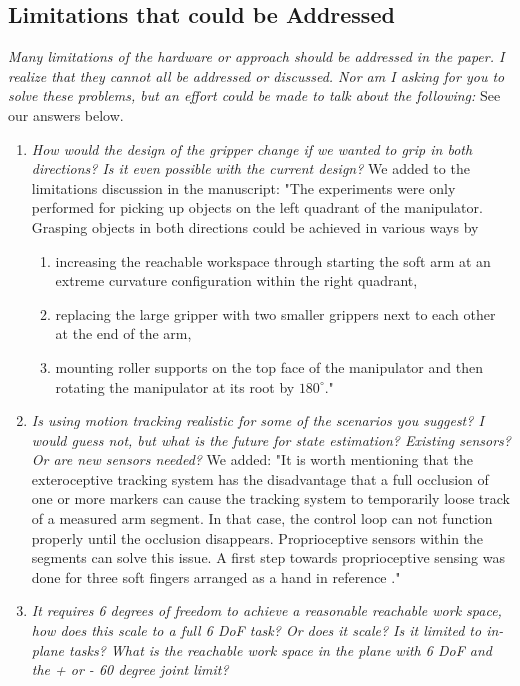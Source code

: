 \documentclass[letterpaper, 10 pt, twocolumn, conference]{article}
\begin{document}
\subsection{Limitations that could be Addressed}
\textit{Many limitations of the hardware or approach should be addressed in the paper. I realize that they cannot all be addressed or discussed. Nor am I asking for you to solve these problems, but an effort could be made to talk about the following:}
See our answers below.
%
\begin{enumerate}
\item \textit{How would the design of the gripper change if we wanted to grip in both directions? Is it even possible with the current design?}
%
We added to the limitations discussion in the manuscript:
"The experiments were only performed for picking up objects on the left quadrant of the manipulator. Grasping objects in both directions could be achieved in various ways by 
\begin{enumerate}
\item increasing the reachable workspace through starting the soft arm at an extreme curvature configuration within the right quadrant,
\item replacing the large gripper with two smaller grippers next to each other at the end of the arm, 
\item mounting roller supports on the top face of the manipulator and then rotating the manipulator at its root by $180^{\circ}$."  
\end{enumerate}
%
\item \textit{Is using motion tracking realistic for some of the scenarios you suggest? I would guess not, but what is the future for state estimation? Existing sensors? Or are new sensors needed?}
%
We added:
"It is worth mentioning that the exteroceptive tracking system has the disadvantage that a full occlusion of one or more markers can cause the tracking system to temporarily loose track of a measured arm segment. In that case, the control loop can not function properly until the occlusion disappears. Proprioceptive sensors within the segments can solve this issue. A first step towards proprioceptive sensing was done for three soft fingers arranged as a hand in reference \cite{homberg2015haptic}."
%
\item \textit{It requires 6 degrees of freedom to achieve a reasonable reachable work space, how does this scale to a full 6 DoF task? Or does it scale? Is it limited to in-plane tasks? What is the reachable work space in the plane with 6 DoF and the + or - 60 degree joint limit?}

\end{enumerate}
\end{document}
